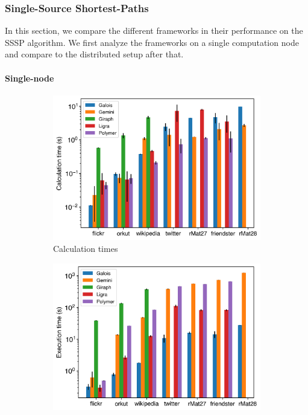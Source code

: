 

\subsubsection{Single-Source Shortest-Paths}
In this section, we compare the different frameworks in their performance on the SSSP algorithm. We first analyze the frameworks on a single computation node and compare to the distributed setup after that.
\paragraph{Single-node}
\begin{figure}
	\begin{subfigure}{0.32\textwidth}
		\includegraphics[width=\linewidth]{../../plots/singleNodeSSSP_calcTime.png}
		\caption{Calculation times}
		\label{fig:singleNodeSSSP_calc}
	\end{subfigure}
	\hfil
	\begin{subfigure}{0.32\textwidth}
		\includegraphics[width=\linewidth]{../../plots/singleNodeSSSP_execTime.png}

\end{subfigure}
\end{figure}
